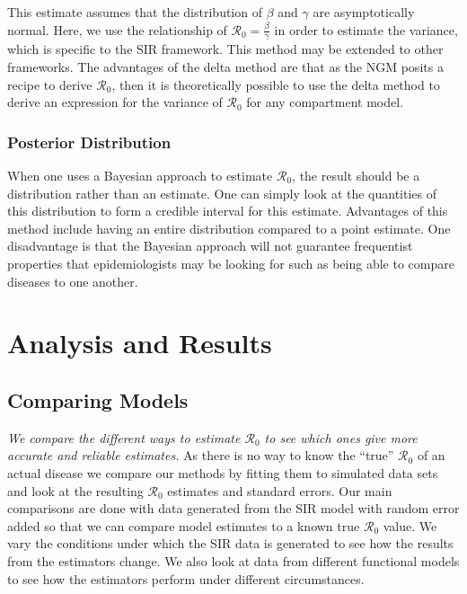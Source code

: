 \documentclass[12pt]{article}
\newcommand{\rr}{\ensuremath{\mathcal{R}_0}}
\begin{document}
This estimate assumes that the distribution of $\beta$ and $\gamma$ are asymptotically normal.  Here, we use the relationship of $\rr = \frac{\beta}{\gamma}$ in order to estimate the variance, which is specific to the SIR framework.  This method may be extended to other frameworks.  The advantages of the delta method are that as the NGM posits a recipe to derive $\rr$, then it is theoretically possible to use the delta method to derive an expression for the variance of $\rr$ for any compartment model.


\subsubsection{Posterior Distribution}
When one uses a Bayesian approach to estimate $\rr$, the result should be a distribution rather than an estimate.  One can simply look at the quantities of this distribution to form a credible interval for this estimate.  Advantages of this method include having an entire distribution compared to a point estimate.  One disadvantage is that the Bayesian approach will not guarantee frequentist properties that epidemiologists may be looking for such as being able to compare diseases to one another.







\section{Analysis and Results}
\label{sec:results}

\subsection{Comparing Models}

\textit{We compare the different ways to estimate $\rr$ to see which ones give more accurate and reliable estimates.}  As there is no way to know the ``true'' $\rr$ of an actual disease we compare our methods by fitting them to simulated data sets and look at the resulting $\rr$ estimates and standard errors. Our main comparisons are done with data generated from the SIR model with random error added so that we can compare model estimates to a known true $\rr$ value. We vary the conditions under which the SIR data is generated to see how the results from the estimators change. We also look at data from different functional models to see how the estimators perform under different circumstances.
\end{document}
